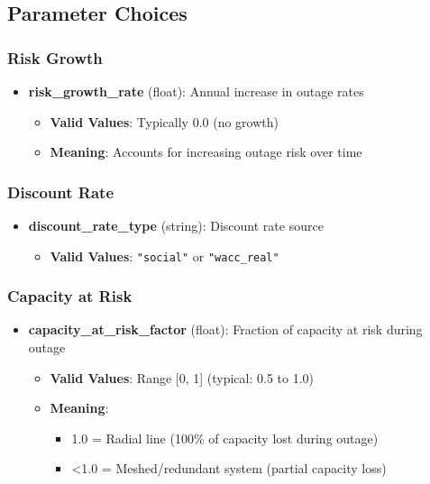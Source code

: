 \documentclass[ctcc_full_documentation.tex]{subfiles}
\begin{document}
\subsection{Parameter Choices}

\subsubsection{Risk Growth}

\begin{itemize}
    \item \textbf{risk\_growth\_rate} (float): Annual increase in outage rates
    \begin{itemize}
        \item \textbf{Valid Values}: Typically 0.0 (no growth)
        \item \textbf{Meaning}: Accounts for increasing outage risk over time
    \end{itemize}
\end{itemize}

\subsubsection{Discount Rate}

\begin{itemize}
    \item \textbf{discount\_rate\_type} (string): Discount rate source
    \begin{itemize}
        \item \textbf{Valid Values}: \texttt{"social"} or \texttt{"wacc\_real"}
    \end{itemize}
\end{itemize}

\subsubsection{Capacity at Risk}

\begin{itemize}
    \item \textbf{capacity\_at\_risk\_factor} (float): Fraction of capacity at risk during outage
    \begin{itemize}
        \item \textbf{Valid Values}: Range [0, 1] (typical: 0.5 to 1.0)
        \item \textbf{Meaning}: 
        \begin{itemize}
            \item 1.0 = Radial line (100\% of capacity lost during outage)
            \item <1.0 = Meshed/redundant system (partial capacity loss)
        \end{itemize}
    \end{itemize}
\end{itemize}
\end{document}
